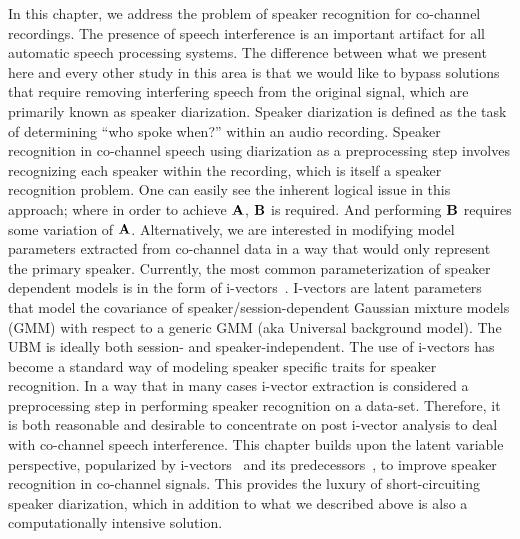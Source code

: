 In this chapter, we address the problem of speaker recognition for co-channel recordings.
The presence of speech interference is an important artifact for all automatic speech processing systems. 
The difference between what we present here and every other study in this area is that we would like to bypass solutions that require removing interfering speech from the original signal, which are primarily known as speaker diarization. Speaker diarization is defined as the task of determining ``who spoke when?'' within an audio recording. 
Speaker recognition in co-channel speech using diarization as a preprocessing step involves recognizing each speaker within the recording, which is itself a speaker recognition problem. 
One can easily see the inherent logical issue in this approach; where in order to achieve $\bf A$, $\bf B$ is required. And performing $\bf B$ requires some variation of $\bf A$.
Alternatively, we are interested in modifying model parameters extracted from co-channel data in a way that would only represent the primary speaker. 
Currently, the most common parameterization of speaker dependent models is in the form of i-vectors~\cite{dehak2011front}. 
I-vectors are latent parameters that model the covariance of speaker/session-dependent Gaussian mixture models (GMM) with respect to a generic GMM (aka Universal background model). The UBM is ideally both session- and speaker-independent.
The use of i-vectors has become a standard way of modeling speaker specific traits for speaker recognition. 
In a way that in many cases i-vector extraction is considered a preprocessing step in performing speaker recognition on a data-set. 
Therefore, it is both reasonable and desirable to concentrate on post i-vector analysis to deal with co-channel speech interference. 
This chapter builds upon the latent variable perspective, popularized by i-vectors~\cite{dehak2011front} and its predecessors~\cite{kenny2014jfa}, to improve speaker recognition in co-channel signals. 
This provides the luxury of short-circuiting speaker diarization, which in addition to what we described above is also a computationally intensive solution. 


